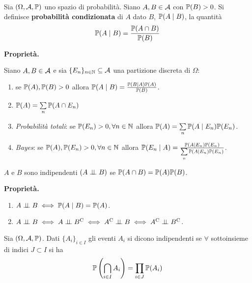 
\ParteEsercizi

\begin{definition}
	Sia $(\Omega,\mathcal{A},\mathbb{P})$ uno spazio di probabilità. Siano $A,B\in \mathcal{A}$ con $\mathbb{P}(B)  >0$. Si definisce \textbf{probabilità condizionata} di $A$ dato $B$, $\mathbb{P}(A\mid B)$, la quantità
	\begin{equation*}
		\mathbb{P}(A\mid B) =\frac{\mathbb{P}(A\cap B)}{\mathbb{P}(B)}
	\end{equation*}
\end{definition}
\textbf{Proprietà.}

Siano $A,B\in \mathcal{A}$ e sia $\{E_{n}\}_{n\in \mathbb{N}} \subseteq \mathcal{A}$ una partizione discreta di $\Omega $:
\begin{enumerate}
	\item se $\mathbb{P}(A) ,\mathbb{P}(B)  >0$ allora $\mathbb{P}(A\mid B) =\frac{\mathbb{P}(B\mid A)\mathbb{P}(A)}{\mathbb{P}(B)}$.
	\item $\mathbb{P}(A) =\sum\limits_{n}\mathbb{P}(A\cap E_{n})$
	\item \textit{Probabilità totali}: se $\mathbb{P}(E_{n})  >0,\forall n\in \mathbb{N}$ allora $\mathbb{P}(A) =\sum\limits_{n}\mathbb{P}(A\mid E_{n})\mathbb{P}(E_{n})$.
	\item \textit{Bayes}: se $\mathbb{P}(A) ,\mathbb{P}(E_{n})  >0,\forall n\in \mathbb{N}$ allora $\mathbb{P}(E_{n} \mid A) =\frac{\mathbb{P}(A\mid E_{n})\mathbb{P}(E_{n})}{\sum\limits_{n}\mathbb{P}(A\mid E_{n})\mathbb{P}(E_{n})}$.
\end{enumerate}
\begin{definition}
$A$ e $B$ sono indipendenti $(A\perp \!\!\! \perp B)$ se $\mathbb{P}(A\cap B) =\mathbb{P}(A)\mathbb{P}(B)$.
\end{definition}
\textbf{Proprietà.}
\begin{enumerate}
\item $A\perp \!\!\! \perp B\iff \mathbb{P}(A\mid B) =\mathbb{P}(A)$.
\item $A\indep B\iff A\indep B\complementary \iff A\complementary \indep B\iff A\complementary \indep B\complementary$.
\end{enumerate}
\begin{definition}
	Sia $(\Omega,\mathcal{A},\mathbb{P})$. Dati $\{A_{i}\}_{i\in I}$ gli eventi $A_{i}$ si dicono indipendenti se $\forall $ sottoinsieme di indici $J\subset I$ si ha
	\begin{equation*}
		\mathbb{P}\left(\bigcap_{i\in I} A_{i}\right) =\prod_{i\in J}\mathbb{P}(A_{i})
	\end{equation*}
\end{definition}

\Esercizio{}

